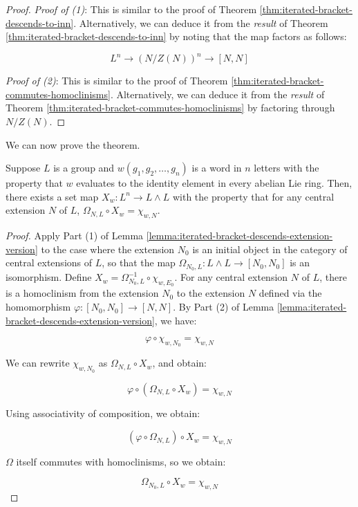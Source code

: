 \documentclass{ucetd}
\begin{document}
\begin{proof}
  {\em Proof of (1)}: This is similar to the proof of Theorem
  \ref{thm:iterated-bracket-descends-to-inn}. Alternatively, we can
  deduce it from the {\em result} of Theorem
  \ref{thm:iterated-bracket-descends-to-inn} by noting that the
  map factors as follows:

  $$L^n \to (N/Z(N))^n \to [N,N]$$

  {\em Proof of (2)}: This is similar to the proof of Theorem
  \ref{thm:iterated-bracket-commutes-homoclinisms}. Alternatively,
  we can deduce it from the {\em result} of Theorem
  \ref{thm:iterated-bracket-commutes-homoclinisms} by factoring
  through $N/Z(N)$.
\end{proof}

We can now prove the theorem.

\begin{theorem}\label{thm:iterated-bracket-map-to-exteriorsquare}
  Suppose $L$ is a group and $w(g_1,g_2,\dots,g_n)$ is a word in $n$
  letters with the property that $w$ evaluates to the identity element
  in every abelian Lie ring. Then, there exists a set map $X_w:L^n \to
  L \wedge L$ with the property that for any central extension $N$ of
  $L$, $\Omega_{N,L} \circ X_w = \chi_{w,N}$.
\end{theorem}

\begin{proof}
  Apply Part (1) of Lemma
  \ref{lemma:iterated-bracket-descends-extension-version} to the
  case where the extension $N_0$ is an initial object in the category
  of central extensions of $L$, so that the map $\Omega_{N_0,L}: L
  \wedge L \to [N_0,N_0]$ is an isomorphism. Define $X_w =
  \Omega_{N_0,L}^{-1} \circ \chi_{w,E_0}$. For any central extension
  $N$ of $L$, there is a homoclinism from the extension $N_0$ to the
  extension $N$ defined via the homomorphism $\varphi: [N_0,N_0] \to
  [N,N]$. By Part (2) of Lemma
  \ref{lemma:iterated-bracket-descends-extension-version}, we have:

  $$\varphi \circ \chi_{w,N_0} = \chi_{w,N}$$

  We can rewrite $\chi_{w,N_0}$ as $\Omega_{N,L} \circ X_w$, and obtain:

  $$\varphi \circ (\Omega_{N,L} \circ X_w) = \chi_{w,N}$$

  Using associativity of composition, we obtain:

  $$(\varphi \circ \Omega_{N,L}) \circ X_w = \chi_{w,N}$$

  $\Omega$ itself commutes with homoclinisms, so we obtain:

  $$\Omega_{N_0,L} \circ X_w = \chi_{w,N}$$
\end{proof}
\end{document}
